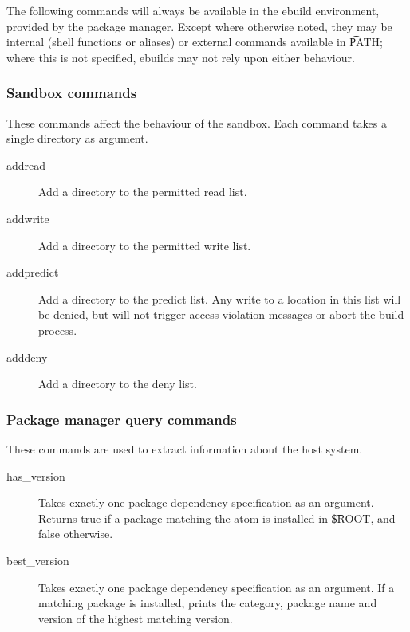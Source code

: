 \label{pkg-mgr-commands}

The following commands will always be available in the ebuild environment, provided by the package
manager. Except where otherwise noted, they may be internal (shell functions or aliases) or external
commands available in \t{PATH}; where this is not specified, ebuilds may not rely upon either
behaviour.

\subsubsection{Sandbox commands}
These commands affect the behaviour of the sandbox. Each command takes a single directory as
argument.
\begin{description}
\item[addread] Add a directory to the permitted read list.
\item[addwrite] Add a directory to the permitted write list.
\item[addpredict] Add a directory to the predict list. Any write to a location in this list will be
    denied, but will not trigger access violation messages or abort the build process.
\item[adddeny] Add a directory to the deny list.
\end{description}

\subsubsection{Package manager query commands}
These commands are used to extract information about the host system.
\begin{description}
\item[has\_version] Takes exactly one package dependency specification as an argument. Returns
    true if a package matching the atom is installed in \t{\$ROOT}, and false otherwise.
\item[best\_version] Takes exactly one package dependency specification as an argument. If a
    matching package is installed, prints the category, package name and version of the highest
    matching version.
\end{description}

